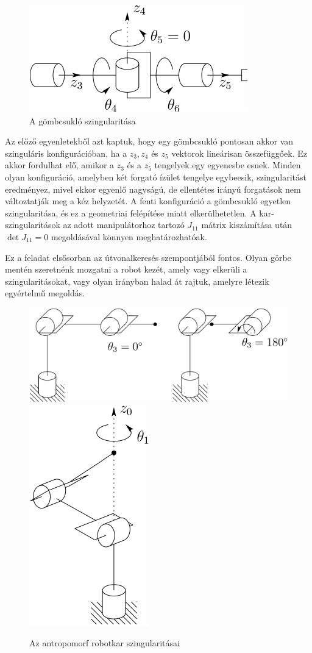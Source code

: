 \documentclass[12pt,a4paper]{report}
\theoremstyle{remark}
\theoremstyle{definition}
\begin{document}
\begin{figure}[h]
\centering
\includegraphics[width=0.5\linewidth]{./images/Wrist_singularity}
\caption{A gömbcsukló szingularitása}
\end{figure}

Az előző egyenletekből azt kaptuk, hogy egy gömbcsukló pontosan akkor van szinguláris konfigurációban, ha a 
$z_3, z_4$ és $z_5$ vektorok lineárisan összefüggőek. Ez akkor fordulhat elő, amikor a $z_3$ és a $z_5$ tengelyek 
egy egyenesbe esnek. Minden olyan konfiguráció, amelyben két forgató ízület tengelye egybeesik, szingularitást 
eredményez, mivel ekkor egyenlő nagyságú, de ellentétes irányú forgatások nem változtatják meg a kéz helyzetét. 
A fenti konfiguráció a gömbcsukló egyetlen szingularitása, és ez a geometriai felépítése miatt elkerülhetetlen. 
A kar-szingularitások az adott manipulátorhoz tartozó $J_{11}$ mátrix kiszámítása után $\det J_{11} = 0$ 
megoldásával könnyen meghatározhatóak.

Ez a feladat elsősorban az útvonalkeresés szempontjából fontos. Olyan görbe mentén szeretnénk mozgatni a robot 
kezét, amely vagy elkerüli a szingularitásokat, vagy olyan irányban halad át rajtuk, amelyre létezik egyértelmű 
megoldás.

\begin{figure}[h]
\centering
\includegraphics[width=0.6\linewidth]{./images/Elbow_singularity}\hspace{0.2cm}
\includegraphics[width=0.2\linewidth]{./images/Shoulder_singularity}
\caption{Az antropomorf robotkar szingularitásai}
\end{figure}
\end{document}
